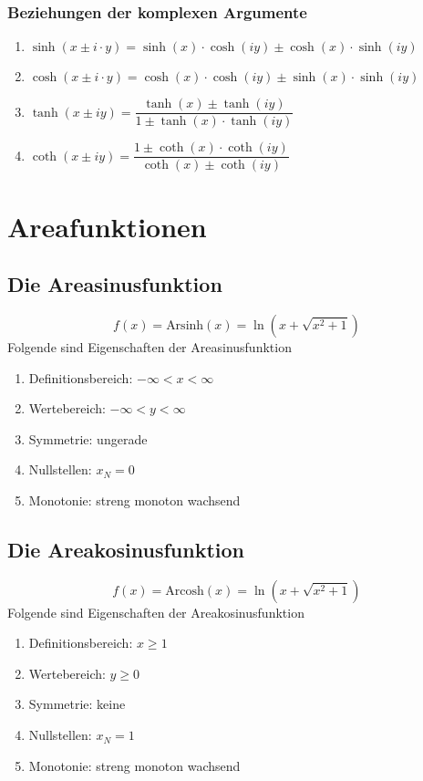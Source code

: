 \subsubsection{Beziehungen der komplexen Argumente}
\begin{enumerate}[$(a)$]
\item $\sinh\left(x\pm i\cdot y\right)=\sinh\left(x\right)\cdot \cosh\left(iy\right)\pm\cosh\left(x\right)\cdot \sinh\left(iy\right)$
\item $\cosh\left(x\pm i\cdot y\right)=\cosh\left(x\right)\cdot \cosh\left(iy\right)\pm \sinh\left(x\right)\cdot \sinh\left(iy\right)$
\item $\tanh\left(x\pm iy\right)=\dfrac{\tanh\left(x\right)\pm \tanh\left(iy\right)}{1\pm \tanh\left(x\right)\cdot \tanh\left(iy\right)}$
\item $\coth\left(x\pm iy\right)=\dfrac{1\pm \coth\left(x\right)\cdot \coth\left(iy\right)}{\coth\left(x\right)\pm \coth\left(iy\right)}$
\end{enumerate}
\section{Areafunktionen}
\subsection{Die Areasinusfunktion}
\begin{equation}
\boxed{f\left(x\right)=\text{Arsinh}\left(x\right)=\ln\left(x+\sqrt{x^2+1}\right)}
\end{equation}
Folgende sind Eigenschaften der Areasinusfunktion
\begin{enumerate}[$(a)$]
\item Definitionsbereich: $-\infty < x < \infty$
\item Wertebereich: $-\infty < y < \infty$
\item Symmetrie: ungerade
\item Nullstellen: $x_N=0$
\item Monotonie: streng monoton wachsend 
\end{enumerate}
\subsection{Die Areakosinusfunktion}
\begin{equation}
\boxed{f\left(x\right)=\text{Arcosh}\left(x\right)=\ln\left(x+\sqrt{x^2+1}\right)}
\end{equation}
Folgende sind Eigenschaften der Areakosinusfunktion
\begin{enumerate}[$(a)$]
\item Definitionsbereich: $x\geq 1$
\item Wertebereich: $y \geq 0$
\item Symmetrie: keine
\item Nullstellen: $x_N=1$
\item Monotonie: streng monoton wachsend 
\end{enumerate}
